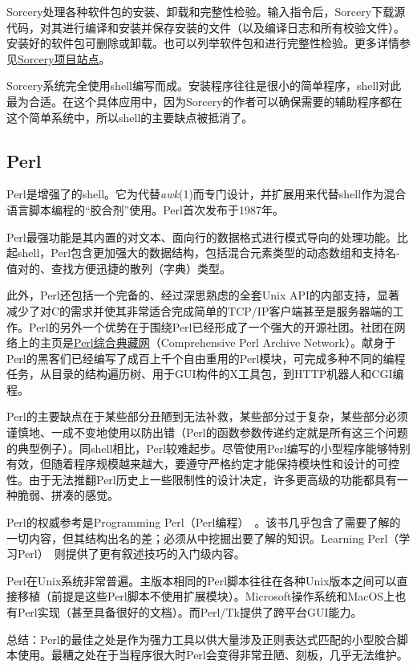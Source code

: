 \documentclass[12pt,oneside]{ctexbook}
\begin{document}
\begin{common-format}
Sorcery处理各种软件包的安装、卸载和完整性检验。输入指令后，Sorcery下载源代码，对其进行编译和安装并保存安装的文件（以及编译日志和所有校验文件）。安装好的软件包可删除或卸载。也可以列举软件包和进行完整性检验。更多详情参见\href{http://sorcerer.wox.org/}{Sorcery项目站点}。

Sorcery系统完全使用shell编写而成。安装程序往往是很小的简单程序，shell对此最为合适。在这个具体应用中，因为Sorcery的作者可以确保需要的辅助程序都在这个简单系统中，所以shell的主要缺点被抵消了。


\subsection{Perl}
Perl是增强了的shell。它为代替\textit{awk}(1)而专门设计，并扩展用来代替shell作为混合语言脚本编程的“胶合剂”使用。Perl首次发布于1987年。

Perl最强功能是其内置的对文本、面向行的数据格式进行模式导向的处理功能。比起shell，Perl包含更加强大的数据结构，包括混合元素类型的动态数组和支持名-值对的、查找方便迅捷的散列（字典）类型。

此外，Perl还包括一个完备的、经过深思熟虑的全套Unix API的内部支持，显著减少了对C的需求并使其非常适合完成简单的TCP/IP客户端甚至是服务器端的工作。Perl的另外一个优势在于围绕Perl已经形成了一个强大的开源社团。社团在网络上的主页是\href{http://www.cpan.org/}{Perl综合典藏网}（Comprehensive Perl Archive Network）。献身于Perl的黑客们已经编写了成百上千个自由重用的Perl模块，可完成多种不同的编程任务，从目录的结构遍历树、用于GUI构件的X工具包，到HTTP机器人和CGI编程。

Perl的主要缺点在于某些部分丑陋到无法补救，某些部分过于复杂，某些部分必须谨慎地、一成不变地使用以防出错（Perl的函数参数传递约定就是所有这三个问题的典型例子）。同shell相比，Perl较难起步。尽管使用Perl编写的小型程序能够特别有效，但随着程序规模越来越大，要遵守严格约定才能保持模块性和设计的可控性。由于无法推翻Perl历史上一些限制性的设计决定，许多更高级的功能都具有一种脆弱、拼凑的感觉。

Perl的权威参考是Programming Perl（Perl编程）~\cite{Wall2000}。该书几乎包含了需要了解的一切内容，但其结构出名的差；必须从中挖掘出要了解的知识。Learning Perl（学习Perl）~\cite{Schwartz-Christiansen}则提供了更有叙述技巧的入门级内容。

Perl在Unix系统非常普遍。主版本相同的Perl脚本往往在各种Unix版本之间可以直接移植（前提是这些Perl脚本不使用扩展模块）。Microsoft操作系统和MacOS上也有Perl实现（甚至具备很好的文档）。而Perl/Tk提供了跨平台GUI能力。

总结：Perl的最佳之处是作为强力工具以供大量涉及正则表达式匹配的小型胶合脚本使用。最糟之处在于当程序很大时Perl会变得非常丑陋、刻板，几乎无法维护。


\end{common-format}
\end{document}
